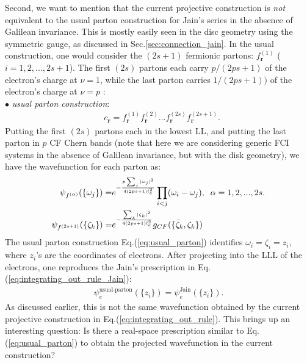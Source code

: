 Second, we want to mention that the current projective construction is \emph{not} equivalent to the usual parton construction for Jain's series in the absence of Galilean invariance. This is mostly easily seen in the disc geometry using the symmetric gauge, as discussed in Sec.\ref{sec:connection_jain}. In the usual construction, one would consider the $(2s+1)$ fermionic partons: $f^{(1)}_{\bm r}$ ($i=1,2,...,2s+1$). The first $(2s)$ partons each carry $p/(2ps+1)$ of the electron's charge at $\nu=1$, while the last parton carries $1/(2ps+1))$ of the electron's charge at $\nu=p$ \cite{jain1989incompressible}:\\
\indent $\bullet$ \emph{usual parton construction}:
\begin{align}
     & c_{\bm r}=f^{(1)}_{\bm r}f^{(2)}_{\bm r}... f^{(2s)}_{\bm r} f^{(2s+1)}_{\bm r}.\label{eq:usual_parton}
\end{align}
Putting the first $(2s)$ partons each in the lowest LL, and putting the last parton in $p$ CF Chern bands (note that here we are considering generic FCI systems in the absence of Galilean invariance, but with the disk geometry), we have the wavefunction for each parton as:
\begin{align}
    \psi_{f^{(\alpha)}}(\{\omega_j\})= & e^{-\frac{p\sum_j|\omega_j|^2}{4(2ps+1)l_e^2}} \prod_{i<j}(\omega_i-\omega_j), \;\;\alpha=1,2,...,2s.\notag \\
    \psi_{f^{(2s+1)}}(\{\zeta_k\})=    & e^{-\frac{\sum_k|\zeta_k|^2}{4(2ps+1)l_e^2}} g_{CF}(\{\bar\zeta_k,\zeta_k\})
\end{align}
The usual parton construction Eq.(\ref{eq:usual_parton}) identifies $\omega_i=\zeta_i=z_i$, where $z_i$'s are the coordinates of electrons. After projecting into the LLL of the electrons, one reproduces the Jain's prescription in Eq.(\ref{eq:integrating_out_rule_Jain}):
\begin{align}
    \psi^{\text{usual-parton}}_e(\{z_i\})=\psi^{\text{Jain}}_e(\{z_i\}).
\end{align}
As discussed earlier, this is not the same wavefunction obtained by the current projective construction in Eq.(\ref{eq:integrating_out_rule}). This brings up an interesting question: Is there a real-space prescription similar to Eq.(\ref{eq:usual_parton}) to obtain the projected wavefunction in the current construction?

